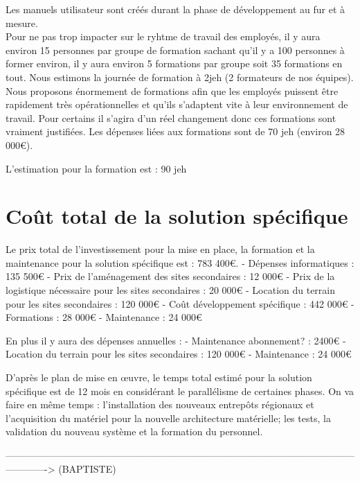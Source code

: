 \begin{description}
\begin{enumerate}
Les manuels utilisateur sont créés durant la phase de développement au fur et à mesure.\\

Pour ne pas trop impacter sur le ryhtme de travail des employés, il y aura environ 15 personnes par groupe de formation sachant qu'il y a 100 personnes à former  environ, il y aura environ 5 formations par groupe soit 35 formations en tout.
Nous estimons la journée de formation à 2jeh (2 formateurs de nos équipes). Nous proposons énormement de formations afin que les employés puissent être rapidement très opérationnelles et qu'ils s'adaptent vite à leur environnement de travail. Pour certains il s'agira d'un réel changement donc ces formations sont vraiment justifiées.
Les dépenses liées aux formations sont de 70 jeh (environ 28 000€).
 
L’estimation pour la formation est : 90 jeh

\end{enumerate}

\section{Coût total de la solution spécifique}

Le prix total de l'investissement pour la mise en place, la formation et la maintenance pour la solution spécifique est : 783 400€.
      - Dépenses informatiques : 135 500€
      - Prix de l'aménagement des sites secondaires : 12 000€
      - Prix de la logistique nécessaire pour les sites secondaires : 20 000€
      - Location du terrain pour les sites secondaires : 120 000€
      - Coût développement spécifique : 442 000€
      - Formations : 28 000€
      - Maintenance : 24 000€

En plus il y aura des dépenses annuelles :
      - Maintenance abonnement? : 2400€
      - Location du terrain pour les sites secondaires : 120 000€
      - Maintenance : 24 000€

          D'après le plan de mise en œuvre, le temps total estimé pour la solution spécifique est de 12 mois en considérant le parallélisme de certaines phases. On va faire en même temps : l'installation des nouveaux entrepôts régionaux et l'acquisition du matériel pour la nouvelle architecture matérielle; les tests, la validation du nouveau système et la formation du personnel.

-------------------------------------------------------------------------------------------------------------------------> (BAPTISTE)


\end{description}
